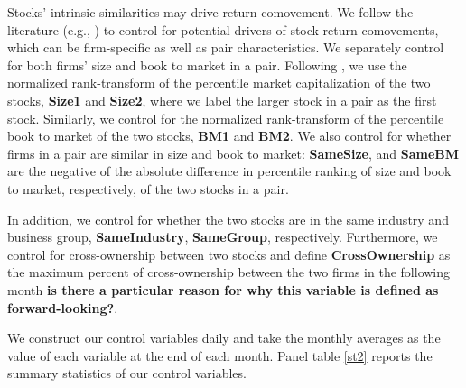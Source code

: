  Stocks' intrinsic similarities may drive return comovement. We follow the literature (e.g., \cite{AntonPolk}) to control for potential drivers of stock return comovements, which can be firm-specific as well as pair characteristics. We separately control for both firms' size and book to market in a pair. Following \cite{AntonPolk}, we use the normalized rank-transform of the percentile market capitalization of the two stocks, \textbf{Size1} and \textbf{Size2}, where we label the
 larger stock in a pair as the first stock. Similarly, we control for the normalized rank-transform of the percentile book to market of the two stocks, \textbf{BM1} and \textbf{BM2}.
 We also control for whether firms in a pair are similar in size and book to market: \textbf{SameSize}, and \textbf{SameBM} are the negative of the absolute difference in percentile ranking of size and book to market, respectively, of the two stocks in a pair.
 
 In addition, we control for whether the two stocks are in the same industry and business group, \textbf{SameIndustry}, \textbf{SameGroup}, respectively. Furthermore, we control for cross-ownership between two stocks and define  \textbf{CrossOwnership} as the maximum percent of cross-ownership between the two firms in the following month \textbf{ is there a particular reason for why this variable is defined as forward-looking?}.


%				



We construct our control variables daily and take the monthly averages as the value of each variable at the end of each month. Panel  table \ref{st2} reports the summary statistics of our control variables.


